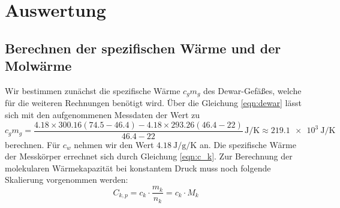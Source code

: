 \section{Auswertung}
\label{sec:Auswertung}
\subsection{Berechnen der spezifischen Wärme und der Molwärme}
Wir bestimmen zunächst die spezifische Wärme $c_gm_g$ des Dewar-Gefäßes, welche für die weiteren Rechnungen benötigt wird.
Über die Gleichung \eqref{eqn:dewar}
lässt sich mit den aufgenommenen Messdaten der Wert zu
\begin{equation} %
    c_gm_g = \frac{4.18\times300.16(74.5-46.4)-4.18\times293.26(46.4-22)}{46.4-22} \, \si{\joule\per\kelvin} \approx \SI{219.1e3}{\joule\per\kelvin} %
\end{equation} %
berechnen.
Für $c_w$ nehmen wir den Wert $\SI{4.18}{\joule\per\g\per\kelvin}$ an\cite{Versuchsanleitung}. %
Die spezifische Wärme der Messkörper errechnet sich durch Gleichung \eqref{eqn:c_k}.
Zur Berechnung der molekularen Wärmekapazität bei konstantem Druck muss noch folgende Skalierung vorgenommen werden:
\begin{equation}
    C_{k,p}=c_k \cdot \frac{m_k}{n_k}=c_k \cdot M_k 
\end{equation}
